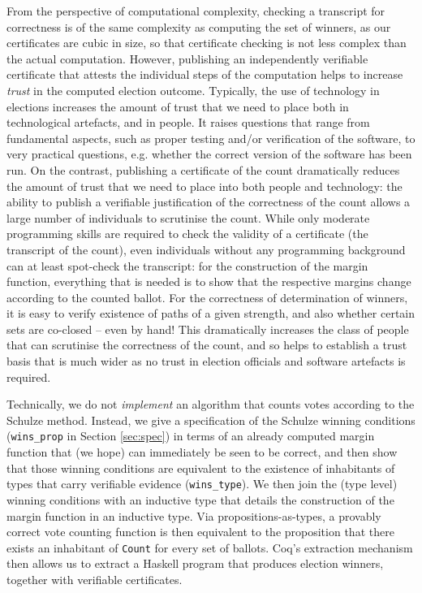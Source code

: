 From the perspective of computational complexity, checking a
transcript for correctness is of the same complexity as computing
the set of winners, as our certificates are cubic in size, so that
certificate checking is not less complex than the actual
computation. 
However, publishing an independently verifiable certificate that
attests the individual steps of the computation helps to increase
\emph{trust} in the computed election outcome. Typically, the use of technology in
elections increases the amount of trust that we need to place both
in technological artefacts, and in people. It raises questions that
range from fundamental aspects, such as proper testing and/or
verification of the software, to very practical questions, e.g.
whether the correct version of the software has been run.  On the
contrast, publishing a certificate of the count dramatically reduces
the amount of trust that we need to place into both people and
technology: the ability to publish a verifiable justification of the
correctness of the count allows a large number of individuals to
scrutinise the count. While only moderate programming skills are
required to check the validity of a certificate (the transcript of
the count), even individuals without any programming background can
at least spot-check the transcript: for the construction of the
margin function, everything that is needed is to show that the
respective margins change according to the counted ballot. For the
correctness of determination of winners, it is easy to verify
existence of paths of a given strength, and also whether certain
sets are co-closed -- even by hand! This dramatically increases the
class of people that can scrutinise the correctness of the count,
and so helps to establish a trust basis that is much wider as no
trust in election officials and software artefacts is required.


Technically, we do not \emph{implement} an algorithm that counts
votes according to the Schulze method. Instead, we give a
specification of the Schulze winning conditions 
(\texttt{wins\_prop} in  Section \ref{sec:spec}) in terms of an
already computed margin function that
(we hope) can immediately be seen to be correct, and then show that those
winning conditions are equivalent to the existence of inhabitants of
types that carry verifiable evidence (\texttt{wins\_type}).  We then
join the (type level) winning conditions with an inductive type that
details the construction of the margin function in an inductive
type. Via propositions-as-types, a provably correct vote counting
function is then equivalent to the proposition that there exists an
inhabitant of \texttt{Count} for every set of ballots.  Coq's
extraction mechanism then allows us to extract a Haskell program
that produces election winners, together with verifiable
certificates. 

